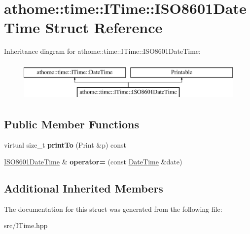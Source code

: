 \hypertarget{structathome_1_1time_1_1_i_time_1_1_i_s_o8601_date_time}{}\section{athome\+:\+:time\+:\+:I\+Time\+:\+:I\+S\+O8601\+Date\+Time Struct Reference}
\label{structathome_1_1time_1_1_i_time_1_1_i_s_o8601_date_time}
Inheritance diagram for athome\+:\+:time\+:\+:I\+Time\+:\+:I\+S\+O8601\+Date\+Time\+:\begin{figure}[H]
\begin{center}
\leavevmode
\includegraphics[height=2.000000cm]{structathome_1_1time_1_1_i_time_1_1_i_s_o8601_date_time}
\end{center}
\end{figure}
\subsection*{Public Member Functions}
\begin{DoxyCompactItemize}
\item 
\mbox{\label{structathome_1_1time_1_1_i_time_1_1_i_s_o8601_date_time_a61bde2502a373b8305b5bde4cf7df075}} 
virtual size\+\_\+t {\bfseries print\+To} (Print \&p) const
\item 
\mbox{\label{structathome_1_1time_1_1_i_time_1_1_i_s_o8601_date_time_a66eca189bb7e28995c7ee6922991018b}} 
\mbox{\hyperlink{structathome_1_1time_1_1_i_time_1_1_i_s_o8601_date_time}{I\+S\+O8601\+Date\+Time}} \& {\bfseries operator=} (const \mbox{\hyperlink{classathome_1_1time_1_1_i_time_1_1_date_time}{Date\+Time}} \&date)
\end{DoxyCompactItemize}
\subsection*{Additional Inherited Members}


The documentation for this struct was generated from the following file\+:\begin{DoxyCompactItemize}
\item 
src/I\+Time.\+hpp\end{DoxyCompactItemize}
